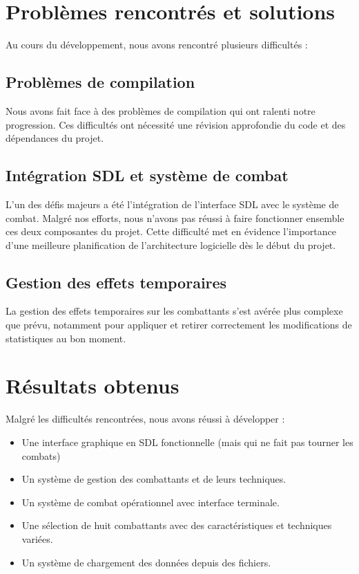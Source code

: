 \documentclass[12pt,a4paper]{article}
\begin{document}
\section{Problèmes rencontrés et solutions}
Au cours du développement, nous avons rencontré plusieurs difficultés :

\subsection{Problèmes de compilation}
Nous avons fait face à des problèmes de compilation qui ont ralenti notre progression. Ces difficultés ont nécessité une révision approfondie du code et des dépendances du projet.

\subsection{Intégration SDL et système de combat}
L'un des défis majeurs a été l'intégration de l'interface SDL avec le système de combat. Malgré nos efforts, nous n'avons pas réussi à faire fonctionner ensemble ces deux composantes du projet. Cette difficulté met en évidence l'importance d'une meilleure planification de l'architecture logicielle dès le début du projet.

\subsection{Gestion des effets temporaires}
La gestion des effets temporaires sur les combattants s'est avérée plus complexe que prévu, notamment pour appliquer et retirer correctement les modifications de statistiques au bon moment.

\section{Résultats obtenus}
Malgré les difficultés rencontrées, nous avons réussi à développer :
\begin{itemize}
    \item Une interface graphique en SDL fonctionnelle (mais qui ne fait pas tourner les combats)
    \item Un système de gestion des combattants et de leurs techniques.
    \item Un système de combat opérationnel avec interface terminale.
    \item Une sélection de huit combattants avec des caractéristiques et techniques variées.
    \item Un système de chargement des données depuis des fichiers.
\end{itemize}
\end{document}
